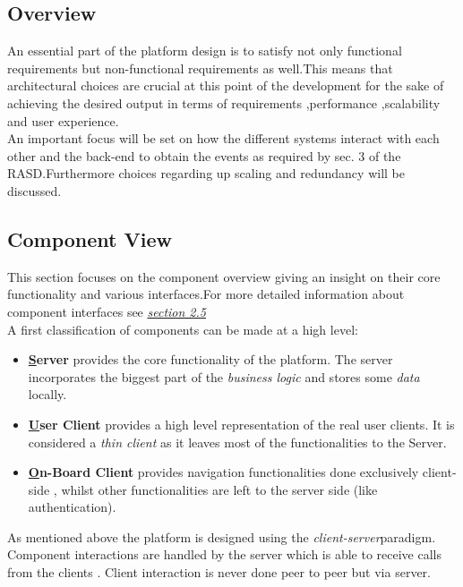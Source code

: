 \subsection{Overview}
An essential part of the platform design is to satisfy not only functional requirements but non-functional requirements as well.This means that architectural choices are crucial at this point of the development for the sake of achieving the desired output in terms of requirements ,performance ,scalability and user experience.\\
An important focus will be set on how the different systems interact with each other and the back-end to obtain the events as required by sec. 3 of the RASD.Furthermore choices regarding up scaling and redundancy will be discussed.\\

\subsection{Component View}
This section focuses on the component overview giving an insight on their core functionality and various interfaces.For more detailed information about component interfaces see \hyperref[sec:CInter]{\emph{section 2.5}} \\
A first classification of components can be made at a high level:
\begin{itemize}
\item \textbf{\hyperref[sec:Server]Server} provides the core functionality of the platform. The server incorporates the biggest part of the \emph{business logic} and stores some \emph{data} locally.
\item \textbf{\hyperref[sec:UserClient]User Client} provides a high level representation of the real user clients. It is considered a \emph{thin client} as it leaves most of the functionalities to the Server.
\item \textbf{\hyperref[sec:OnBClient]On-Board Client} provides navigation functionalities done exclusively client-side , whilst other functionalities are left to the server side (like  authentication).
\end{itemize}
As mentioned above the platform is designed using the \emph{client-server}paradigm. Component interactions are handled by the server which is able to receive calls from the clients . Client interaction is never done peer to peer but via server.


